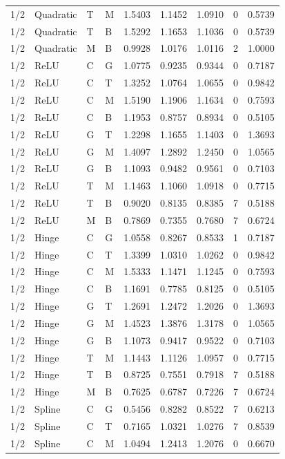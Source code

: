 \begin{longtable}{llllrrrrr}
1/2 & Quadratic & T & M & 1.5403 & 1.1452 & 1.0910 & 0 & 0.5739 \\
1/2 & Quadratic & T & B & 1.5292 & 1.1653 & 1.1036 & 0 & 0.5739 \\
1/2 & Quadratic & M & B & 0.9928 & 1.0176 & 1.0116 & 2 & 1.0000 \\
1/2 & ReLU & C & G & 1.0775 & 0.9235 & 0.9344 & 0 & 0.7187 \\
1/2 & ReLU & C & T & 1.3252 & 1.0764 & 1.0655 & 0 & 0.9842 \\
1/2 & ReLU & C & M & 1.5190 & 1.1906 & 1.1634 & 0 & 0.7593 \\
1/2 & ReLU & C & B & 1.1953 & 0.8757 & 0.8934 & 0 & 0.5105 \\
1/2 & ReLU & G & T & 1.2298 & 1.1655 & 1.1403 & 0 & 1.3693 \\
1/2 & ReLU & G & M & 1.4097 & 1.2892 & 1.2450 & 0 & 1.0565 \\
1/2 & ReLU & G & B & 1.1093 & 0.9482 & 0.9561 & 0 & 0.7103 \\
1/2 & ReLU & T & M & 1.1463 & 1.1060 & 1.0918 & 0 & 0.7715 \\
1/2 & ReLU & T & B & 0.9020 & 0.8135 & 0.8385 & 7 & 0.5188 \\
1/2 & ReLU & M & B & 0.7869 & 0.7355 & 0.7680 & 7 & 0.6724 \\
1/2 & Hinge & C & G & 1.0558 & 0.8267 & 0.8533 & 1 & 0.7187 \\
1/2 & Hinge & C & T & 1.3399 & 1.0310 & 1.0262 & 0 & 0.9842 \\
1/2 & Hinge & C & M & 1.5333 & 1.1471 & 1.1245 & 0 & 0.7593 \\
1/2 & Hinge & C & B & 1.1691 & 0.7785 & 0.8125 & 0 & 0.5105 \\
1/2 & Hinge & G & T & 1.2691 & 1.2472 & 1.2026 & 0 & 1.3693 \\
1/2 & Hinge & G & M & 1.4523 & 1.3876 & 1.3178 & 0 & 1.0565 \\
1/2 & Hinge & G & B & 1.1073 & 0.9417 & 0.9522 & 0 & 0.7103 \\
1/2 & Hinge & T & M & 1.1443 & 1.1126 & 1.0957 & 0 & 0.7715 \\
1/2 & Hinge & T & B & 0.8725 & 0.7551 & 0.7918 & 7 & 0.5188 \\
1/2 & Hinge & M & B & 0.7625 & 0.6787 & 0.7226 & 7 & 0.6724 \\
1/2 & Spline & C & G & 0.5456 & 0.8282 & 0.8522 & 7 & 0.6213 \\
1/2 & Spline & C & T & 0.7165 & 1.0321 & 1.0276 & 7 & 0.8539 \\
1/2 & Spline & C & M & 1.0494 & 1.2413 & 1.2076 & 0 & 0.6670 \\

\end{longtable}
